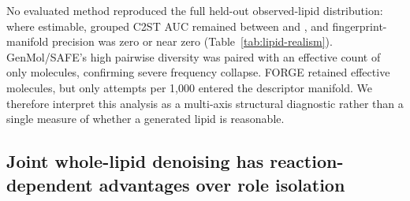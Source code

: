 \documentclass{article}
\begin{document}
\begin{table}[t]
\caption{\textbf{Method-blind structural-realism diagnostic.}
Every entry is mean $\pm$ sample standard deviation across three training seeds and retains all
\ForgeProseAttemptsPerProgram{} requested attempts in the denominator. FP and descriptor P/C report manifold precision per
1,000 attempts and coverage of the source-study-held-out R0 reference in percent. C2ST is grouped
classifier two-sample area under the receiver operating characteristic curve; 0.5 is
indistinguishable. $N_{\mathrm{eff}}$ is the Shannon effective molecule count. N/E denotes a metric that cannot be
estimated. This post-hoc structural diagnostic is not a property, activity or synthesis-success
score.}
\label{tab:lipid-realism}
\centering
\scriptsize
\setlength{\tabcolsep}{1.6pt}
\end{table}

No evaluated method reproduced the full held-out observed-lipid distribution: where estimable,
grouped C2ST AUC remained between \ForgeProseRealismCtwoSTMin{} and
\ForgeProseRealismCtwoSTMax{}, and fingerprint-manifold precision was zero or
near zero (Table~\ref{tab:lipid-realism}). GenMol/SAFE's high pairwise diversity was paired with an
effective count of only \ForgeProseRealismGenmolEffective{} molecules, confirming severe frequency
collapse. FORGE retained \ForgeProseRealismForgeEffective{} effective molecules, but only
\ForgeProseRealismForgeDescriptorPrecision{} attempts per 1,000 entered the descriptor
manifold. We therefore interpret this analysis as a multi-axis structural diagnostic rather than a
single measure of whether a generated lipid is reasonable.



\subsection{Joint whole-lipid denoising has reaction-dependent advantages over role isolation}
\end{document}
